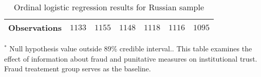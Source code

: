 \begin{table}
\begin{center}
\begin{threeparttable}
\begin{tabular}{l c c c c c c}
\hline
Observations        & $1133$            & $1155$            & $1148$            & $1118$            & $1116$            & $1095$            \\
\hline
\end{tabular}
\begin{tablenotes}[flushleft]
\scriptsize{$^*$ Null hypothesis value outside 89\% credible interval..  This table examines the effect of information about fraud and punitative measures on institutional trust. Fraud treatement group serves as the baseline.}
\end{tablenotes}
\end{threeparttable}
\caption{Ordinal logistic regression results for Russian sample}
\label{table:coefficients}
\end{center}
\end{table}
